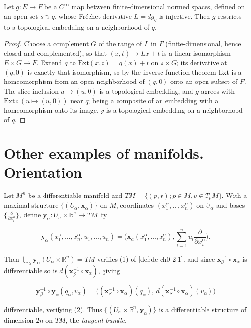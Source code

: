 \begin{lemma}
  \label{lem:dc-ch0-3-7-normalform}
  \leanok
  Let $g:E\to F$ be a $C^\infty$ map between finite-dimensional normed spaces, defined on an
  open set $s\ni q$, whose Fréchet derivative $L=dg_q$ is injective. Then $g$ restricts to a
  topological embedding on a neighborhood of $q$.
\end{lemma}
\begin{proof}
  \sketch
  \leanok
  Choose a complement $G$ of the range of $L$ in $F$ (finite-dimensional, hence closed and
  complemented), so that $(x,t)\mapsto Lx+t$ is a linear isomorphism $E\times G\to F$. Extend
  $g$ to $\mathrm{Ext}(x,t)=g(x)+t$ on $s\times G$; its derivative at $(q,0)$ is exactly that
  isomorphism, so by the inverse function theorem $\mathrm{Ext}$ is a homeomorphism from an
  open neighborhood of $(q,0)$ onto an open subset of $F$. The slice inclusion
  $u\mapsto(u,0)$ is a topological embedding, and $g$ agrees with $\mathrm{Ext}\circ(u\mapsto(u,0))$
  near $q$; being a composite of an embedding with a homeomorphism onto its image, $g$ is a
  topological embedding on a neighborhood of $q$.
\end{proof}

\section{Other examples of manifolds. Orientation}

\begin{example}
  \label{ex:dc-ch0-4-1}
  \leanok
  Let $M^n$ be a differentiable manifold and $TM=\{(p,v); p\in M, v\in T_pM\}$. With
  a maximal structure $\{(U_\alpha,\mathbf{x}_\alpha)\}$ on $M$, coordinates
  $(x_1^\alpha,\dots,x_n^\alpha)$ on $U_\alpha$ and bases
  $\{\frac{\partial}{\partial x_i^\alpha}\}$, define
  $\mathbf{y}_\alpha:U_\alpha\times\mathbb{R}^n\to TM$ by
  
  $$
  \mathbf{y}_\alpha(x_1^\alpha,\dots,x_n^\alpha,u_1,\dots,u_n)=\Big(\mathbf{x}_\alpha(x_1^\alpha,\dots,x_n^\alpha),\sum_{i=1}^n u_i\frac{\partial}{\partial x_i^\alpha}\Big).
  $$
  
  Then $\bigcup_\alpha\mathbf{y}_\alpha(U_\alpha\times\mathbb{R}^n)=TM$ verifies (1)
  of \cref{def:dc-ch0-2-1}, and since $\mathbf{x}_\beta^{-1}\circ\mathbf{x}_\alpha$ is
  differentiable so is $d(\mathbf{x}_\beta^{-1}\circ\mathbf{x}_\alpha)$, giving
  
  $$
  \mathbf{y}_\beta^{-1}\circ\mathbf{y}_\alpha(q_\alpha,v_\alpha)=\big((\mathbf{x}_\beta^{-1}\circ\mathbf{x}_\alpha)(q_\alpha),\,d(\mathbf{x}_\beta^{-1}\circ\mathbf{x}_\alpha)(v_\alpha)\big)
  $$
  
  differentiable, verifying (2). Thus $\{(U_\alpha\times\mathbb{R}^n,\mathbf{y}_\alpha)\}$
  is a differentiable structure of dimension $2n$ on $TM$, the \emph{tangent bundle}.
\end{example}

